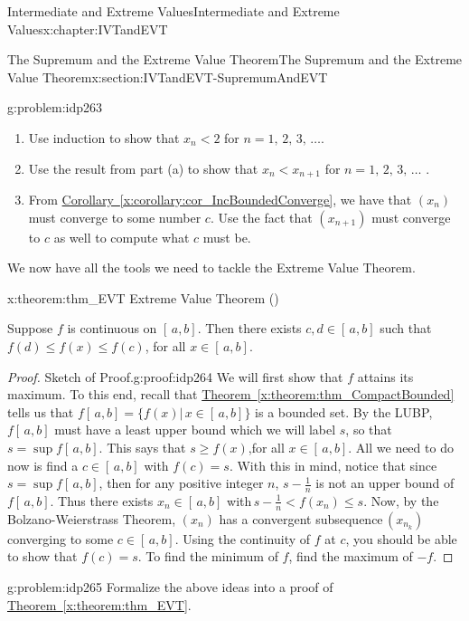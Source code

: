 \begin{chapterptx}{Intermediate and Extreme Values}{}{Intermediate and Extreme Values}{}{}{x:chapter:IVTandEVT}
\begin{sectionptx}{The Supremum and the Extreme Value Theorem}{}{The Supremum and the Extreme Value Theorem}{}{}{x:section:IVTandEVT-SupremumAndEVT}
\begin{problem}{}{g:problem:idp263}
			\begin{enumerate}[label=(\alph*)]
				\item{}Use induction to show that \(x_n\lt 2\) for \(n=1,\,2,\,3,\,\ldots\).%
				\item{}Use the result from part (a) to show that \(x_n\lt x_{n+1}\) for \(n=1,\,2,\,3,\,\ldots\) .%
				\item{}From \hyperref[x:corollary:cor_IncBoundedConverge]{Corollary~{\xreffont\ref{x:corollary:cor_IncBoundedConverge}}}, we have that \(\left(x_n\right)\) must converge to some number \(c\). Use the fact that \(\left(x_{n+1}\right)\) must converge to \(c\) as well to compute what \(c\) must be.%
			\end{enumerate}
		\end{problem}
		We now have all the tools we need to tackle the Extreme Value Theorem.%
		\begin{theorem}{}{}{x:theorem:thm_EVT}%
			\alert{Extreme Value Theorem ()}%
			\par
			 Suppose \(f\) is continuous on \([\,a,b]\). Then there exists \(c,d\in[\,a,b]\) such that \(f(d)\leq f(x)\leq f(c)\), for all \(x\in[\,a,b]\).%
		\end{theorem}
		\begin{proof}{Sketch of Proof.}{g:proof:idp264}
			We will first show that \(f\) attains its maximum. To this end, recall that \hyperref[x:theorem:thm_CompactBounded]{Theorem~{\xreffont\ref{x:theorem:thm_CompactBounded}}} tells us that \(f[\,a,b]=\{f(x)|\,x\in[\,a,b]\}\) is a bounded set. By the LUBP, \(f[\,a,b]\) must have a least upper bound which we will label \(s\), so that \(s=\sup f[\,a,b]\). This says that \(s\geq f(x)\),for all \(x\in[\,a,b]\). All we need to do now is find a \(c\in[\,a,b]\) with \(f(c)=s\). With this in mind, notice that since \(s=\sup f[\,a,b]\), then for any positive integer \(n\), \(s-\frac{1}{n}\) is not an upper bound of \(f[\,a,b]\). Thus there exists \(x_n\in[\,a,b]\) with\(\,s-\frac{1}{n}\lt f(x_n)\leq s\). Now, by the Bolzano-Weierstrass Theorem, \(\left(x_n\right)\) has a convergent subsequence\(\,\left(x_{n_k}\right)\) converging to some \(c\in[\,a,b]\). Using the continuity of \(f\) at \(c\), you should be able to show that \(f(c)=s\). To find the minimum of \(f\), find the maximum of \(-f\).%
		\end{proof}
		\begin{problem}{}{g:problem:idp265}%
			 Formalize the above ideas into a proof of \hyperref[x:theorem:thm_EVT]{Theorem~{\xreffont\ref{x:theorem:thm_EVT}}}.%

\end{problem}
\end{sectionptx}
\end{chapterptx}
